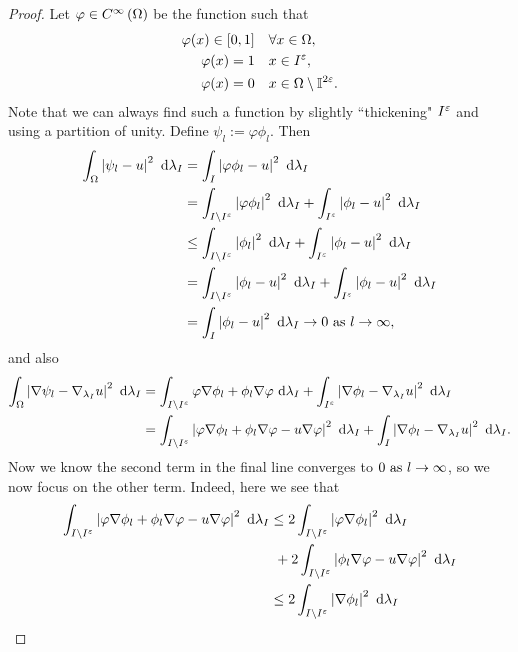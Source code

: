 \begin{proof}
	Let $\varphi\in C^{\infty}\left( \Omega \right)$ be the function such that
	\begin{align*}
		\varphi(x)\in\left[ 0,1 \right] &\quad \forall x\in\Omega, \\
		\varphi(x) = 1 &\quad x\in I^\varepsilon, \\
		\varphi(x) = 0 &\quad x\in \Omega\setminus\mathbb{I}^{2\varepsilon}.
	\end{align*}
	Note that we can always find such a function by slightly ``thickening" $I^\varepsilon$ and using a partition of unity.
	Define $\psi_l := \varphi\phi_l$.
	Then
	\begin{align*}
		\int_{\Omega}\left\lvert  \psi_l - u  \right\rvert^2 \ \mathrm{d}\lambda_I
		&= \int_{I}\left\lvert  \varphi\phi_l - u  \right\rvert^2 \ \mathrm{d}\lambda_I \\
		&= \int_{I\setminus I^\varepsilon}\left\lvert  \varphi\phi_l  \right\rvert^2 \ \mathrm{d}\lambda_I
		+ \int_{I^\varepsilon}\left\lvert  \phi_l - u  \right\rvert^2 \ \mathrm{d}\lambda_I \\
		&\leq \int_{I\setminus I^\varepsilon}\left\lvert  \phi_l  \right\rvert^2 \ \mathrm{d}\lambda_I
		+ \int_{I^\varepsilon}\left\lvert  \phi_l - u  \right\rvert^2 \ \mathrm{d}\lambda_I \\
		&= \int_{I\setminus I^\varepsilon}\left\lvert  \phi_l - u  \right\rvert^2 \ \mathrm{d}\lambda_I
		+ \int_{I^\varepsilon}\left\lvert  \phi_l - u  \right\rvert^2 \ \mathrm{d}\lambda_I \\
		&= \int_{I}\left\lvert  \phi_l - u  \right\rvert^2 \ \mathrm{d}\lambda_I \rightarrow 0 \ \text{as} \ l \rightarrow\infty,	
	\end{align*}
	and also
	\begin{align*}
		\int_{\Omega}\left\lvert  \nabla\psi_l - \nabla_{\lambda_I}u  \right\rvert^2 \ \mathrm{d}\lambda_I
		&= \int_{I\setminus I^\varepsilon}\varphi\nabla\phi_l +  \phi_l\nabla\varphi \ \mathrm{d}\lambda_I
		+ \int_{I^\varepsilon}\left\lvert \nabla\phi_l - \nabla_{\lambda_I}u \right\rvert^2 \ \mathrm{d}\lambda_I \\
		&= \int_{I\setminus I^\varepsilon}\left\lvert \varphi\nabla\phi_l +  \phi_l\nabla\varphi - u\nabla\varphi \right\rvert^2 \ \mathrm{d}\lambda_I
		+ \int_{I}\left\lvert \nabla\phi_l - \nabla_{\lambda_I}u \right\rvert^2 \ \mathrm{d}\lambda_I.
	\end{align*}
	Now we know the second term in the final line converges to $0\ \text{as} \ l \rightarrow\infty$, so we now focus on the other term.
	Indeed, here we see that
	\begin{align*}
		\integral{I\setminus I^\eps}{\abs{\varphi\grad\phi_l +  \phi_l\grad\varphi - u\grad\varphi}^2}{\lambda_I}
		&\leq 2\integral{I\setminus I^\eps}{\abs{\varphi\grad\phi_l}^2}{\lambda_I} \\
		& \ + 2\integral{I\setminus I^\eps}{\abs{\phi_l\grad\varphi - u\grad\varphi}^2}{\lambda_I} \\
		&\leq 2\integral{I\setminus I^\eps}{\abs{\grad\phi_l}^2}{\lambda_I} \\

\end{align*}
\end{proof}
